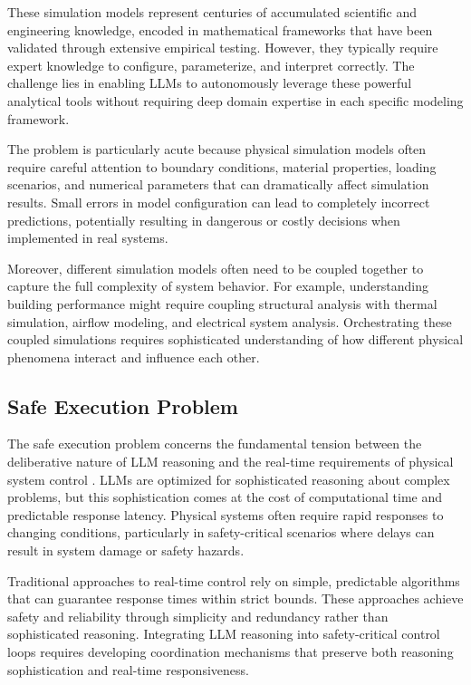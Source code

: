 These simulation models represent centuries of accumulated scientific and engineering knowledge, encoded in mathematical frameworks that have been validated through extensive empirical testing. However, they typically require expert knowledge to configure, parameterize, and interpret correctly. The challenge lies in enabling LLMs to autonomously leverage these powerful analytical tools without requiring deep domain expertise in each specific modeling framework.

The problem is particularly acute because physical simulation models often require careful attention to boundary conditions, material properties, loading scenarios, and numerical parameters that can dramatically affect simulation results. Small errors in model configuration can lead to completely incorrect predictions, potentially resulting in dangerous or costly decisions when implemented in real systems.

Moreover, different simulation models often need to be coupled together to capture the full complexity of system behavior. For example, understanding building performance might require coupling structural analysis with thermal simulation, airflow modeling, and electrical system analysis. Orchestrating these coupled simulations requires sophisticated understanding of how different physical phenomena interact and influence each other.

\subsection{Safe Execution Problem}

The safe execution problem concerns the fundamental tension between the deliberative nature of LLM reasoning and the real-time requirements of physical system control \cite{leveson2011engineering, knight2002safety}. LLMs are optimized for sophisticated reasoning about complex problems, but this sophistication comes at the cost of computational time and predictable response latency. Physical systems often require rapid responses to changing conditions, particularly in safety-critical scenarios where delays can result in system damage or safety hazards.

Traditional approaches to real-time control rely on simple, predictable algorithms that can guarantee response times within strict bounds. These approaches achieve safety and reliability through simplicity and redundancy rather than sophisticated reasoning. Integrating LLM reasoning into safety-critical control loops requires developing coordination mechanisms that preserve both reasoning sophistication and real-time responsiveness.

